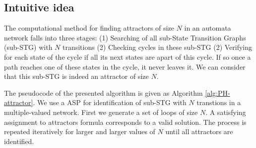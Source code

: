 \subsection{Intuitive idea}
The computational method for finding attractors of size $N$ in an automata network falls into three stages: (1) Searching of all sub-State Transition Graphs (sub-STG) with $N$ transitions (2) Checking cycles in these sub-STG (2) Verifying for each state of the cycle if all its next states are apart of this cycle. If so once a path reaches one of these states in the cycle, it never leaves it. We can consider that this sub-STG is indeed an attractor of size $N$.

The pseudocode of the presented algorithm is given as Algorithm \ref{alg:PH-attractor}. We use a ASP for identification of sub-STG with $N$ transtions in a multiple-valued network. First we generate a set of loops of size $N$. A satisfying assignment to attractors formula corresponds to a valid solution. The process is repeated iteratively for larger and larger values of $N$ until all attractors are identified. 

